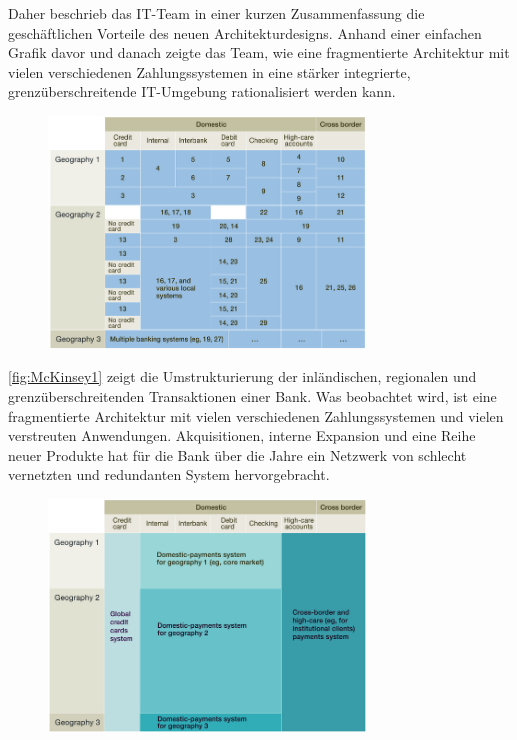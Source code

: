 \documentclass[
	doc,
	a4paper,
	helv
	]{apa6}
\begin{document}
Daher beschrieb das IT-Team in einer kurzen Zusammenfassung die geschäftlichen Vorteile des neuen Architekturdesigns. Anhand einer einfachen Grafik davor und danach zeigte das Team, wie eine fragmentierte Architektur mit vielen verschiedenen Zahlungssystemen in eine stärker integrierte, grenzüberschreitende IT-Umgebung rationalisiert werden kann.

\begin{figure}[!htbp]
\begin{center}
\includegraphics[width=0.75\textwidth]{Abbildungen/McKinsey1.png}
\caption{\autocite{McKinsey}}
\label{fig:McKinsey1}
\end{center}
\end{figure}



\autoref{fig:McKinsey1} zeigt die Umstrukturierung der inländischen, regionalen und grenzüberschreitenden Transaktionen einer Bank. Was beobachtet wird, ist eine fragmentierte Architektur mit vielen verschiedenen Zahlungssystemen und vielen verstreuten Anwendungen. Akquisitionen, interne Expansion und eine Reihe neuer Produkte hat für die Bank über die Jahre ein Netzwerk von schlecht vernetzten und redundanten System hervorgebracht.


\begin{figure}[!htbp]
\begin{center}
\includegraphics[width=0.75\textwidth]{Abbildungen/McKinsey2.png}
\caption{\autocite{McKinsey}}
\label{fig:McKinsey2}
\end{center}
\end{figure}
\end{document}
